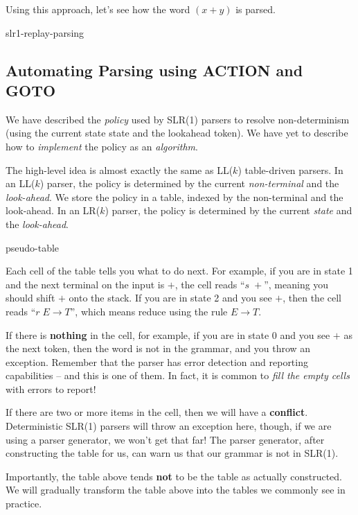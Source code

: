 Using this approach, let's see how the word $(x+y)$ is parsed.

\begin{center}
    {slr1-replay-parsing}
\end{center}

\subsection{Automating Parsing using ACTION and GOTO}
We have described the \textit{policy} used by SLR(1) parsers to resolve non-determinism (using the current state state and the lookahead token). We have yet to describe how to \textit{implement} the policy as an \textit{algorithm}.

The high-level idea is almost exactly the same as LL($k$) table-driven parsers. In an LL($k$) parser, the policy is determined by the current \textit{non-terminal} and the \textit{look-ahead}. We store the policy in a table, indexed by the non-terminal and the look-ahead. In an LR($k$) parser, the policy is determined by the current \textit{state} and the \textit{look-ahead}. 

\begin{center}
    {pseudo-table}
\end{center}

Each cell of the table tells you what to do next. For example, if you are in state 1 and the next terminal on the input is $+$, the cell reads ``$s\;+$'', meaning you should shift $+$ onto the stack. If you are in state 2 and you see $+$, then the cell reads ``$r \; E \to T$'', which means reduce using the rule $E \to T$. 

If there is \textbf{nothing} in the cell, for example, if you are in state 0 and you see $+$ as the next token, then the word is not in the grammar, and you throw an exception. Remember that the parser has error detection and reporting capabilities -- and this is one of them. In fact, it is common to \textit{fill the empty cells} with errors to report!

If there are two or more items in the cell, then we will have a \textbf{conflict}. Deterministic SLR(1) parsers will throw an exception here, though, if we are using a parser generator, we won't get that far! The parser generator, after constructing the table for us, can warn us that our grammar is not in SLR(1).

Importantly, the table above tends \textbf{not} to be the table as actually constructed. We will gradually transform the table above into the tables we commonly see in practice.

